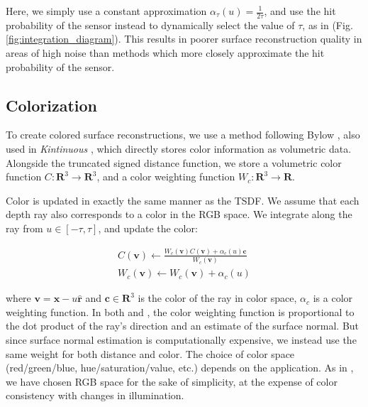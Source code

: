 \documentclass[10pt,twocolumn,letterpaper]{article}
\newcommand{\figref}[1]{Fig.\ref{#1}}
\begin{document}
Here, we simply use a constant approximation $\alpha_{\tau}(u) = \frac{1}{2
\tau}$, and use the hit probability of the sensor instead to  dynamically select
the value of $\tau$, as in \cite{Nguyen2012} (\figref{fig:integration_diagram}).
This results in poorer surface reconstruction quality in areas of high noise
than methods which more closely approximate the hit probability of the sensor.

\subsection{Colorization}
To create colored surface reconstructions, we use a method following Bylow
\etal \cite{Bylow2013}, also used in \textit{Kintinuous} \cite{Whelan2013},
which directly stores color information as volumetric data. Alongside the
truncated signed distance function, we store a volumetric color function
$C : \mathbf{R}^3 \to \mathbf{R}^3$, and a color weighting function
$W_{c} :
\mathbf{R}^3 \to \mathbf{R}$.

Color is updated in exactly the same manner as the TSDF. We assume that each
depth ray also corresponds to a color in the RGB space. We integrate along the
ray from $u \in [-\tau, \tau]$, and update the color:

\begin{align}
C(\mathbf{v}) \gets \frac{W_c(\mathbf{v}) C(\mathbf{v}) +
\alpha_c(u) \mathbf{c}}{W_c(\mathbf{v})}
\\
%
W_c(\mathbf{v}) \gets W_c(\mathbf{v}) + \alpha_c(u)
\end{align}

\noindent where $\mathbf{v} = \mathbf{x} - u\mathbf{\hat{r}}$ and $\mathbf{c}
\in \mathbf{R}^3$ is the color of the ray in color space, $\alpha_c$ is a color weighting function. In both \cite{Bylow2013} and
\cite{Whelan2013}, the color weighting function is proportional to the dot
product of the ray's direction and an estimate of the surface normal. But since
surface normal estimation is computationally expensive, we instead use the same
weight for both distance and color. The choice of color space (red/green/blue,
hue/saturation/value, etc.) depends on the application. As in \cite{Bylow2013}, we have chosen RGB space for the sake
of simplicity, at the expense of color consistency with changes in illumination.

\end{document}
